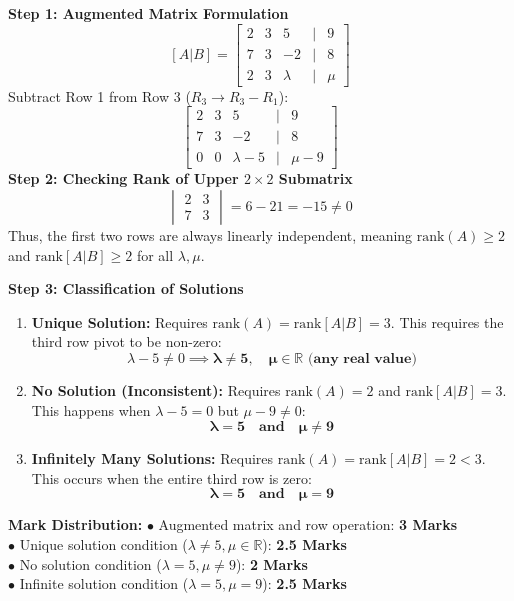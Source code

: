 \begin{solutionbox}
\textbf{Step 1: Augmented Matrix Formulation}
\[
[A|B] = \begin{bmatrix}
2 & 3 & 5 & | & 9 \\
7 & 3 & -2 & | & 8 \\
2 & 3 & \lambda & | & \mu
\end{bmatrix}
\]
Subtract Row 1 from Row 3 ($R_3 \to R_3 - R_1$):
\[
\begin{bmatrix}
2 & 3 & 5 & | & 9 \\
7 & 3 & -2 & | & 8 \\
0 & 0 & \lambda - 5 & | & \mu - 9
\end{bmatrix}
\]
\textbf{Step 2: Checking Rank of Upper $2\times 2$ Submatrix}
\[
\begin{vmatrix} 2 & 3 \\ 7 & 3 \end{vmatrix} = 6 - 21 = -15 \neq 0
\]
Thus, the first two rows are always linearly independent, meaning $\text{rank}(A) \ge 2$ and $\text{rank}[A|B] \ge 2$ for all $\lambda, \mu$.

\textbf{Step 3: Classification of Solutions}
\begin{enumerate}[label=(\roman*)]
    \item \textbf{Unique Solution:}
    Requires $\text{rank}(A) = \text{rank}[A|B] = 3$.
    This requires the third row pivot to be non-zero:
    \[
    \lambda - 5 \neq 0 \implies \mathbf{\lambda \neq 5}, \quad \mathbf{\mu \in \mathbb{R} \text{ (any real value)}}
    \]
    \item \textbf{No Solution (Inconsistent):}
    Requires $\text{rank}(A) = 2$ and $\text{rank}[A|B] = 3$.
    This happens when $\lambda - 5 = 0$ but $\mu - 9 \neq 0$:
    \[
    \mathbf{\lambda = 5 \quad \text{and} \quad \mu \neq 9}
    \]
    \item \textbf{Infinitely Many Solutions:}
    Requires $\text{rank}(A) = \text{rank}[A|B] = 2 < 3$.
    This occurs when the entire third row is zero:
    \[
    \mathbf{\lambda = 5 \quad \text{and} \quad \mu = 9}
    \]
\end{enumerate}

\begin{markingrubric}
\textbf{Mark Distribution:}
$\bullet$ Augmented matrix and row operation: \textbf{3 Marks}\\
$\bullet$ Unique solution condition ($\lambda \neq 5, \mu \in \mathbb{R}$): \textbf{2.5 Marks}\\
$\bullet$ No solution condition ($\lambda = 5, \mu \neq 9$): \textbf{2 Marks}\\
$\bullet$ Infinite solution condition ($\lambda = 5, \mu = 9$): \textbf{2.5 Marks}
\end{markingrubric}
\end{solutionbox}

